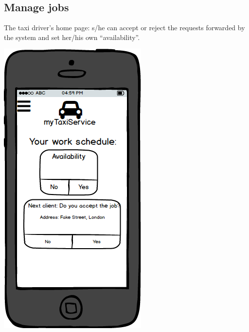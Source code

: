 \documentclass[a4paper,11pt]{report} %
\begin{document}
	\subsection{Manage jobs} The taxi driver's home page: s/he can accept or reject the requests forwarded by the system and set her/his own ``availability''.
	\begin{center}
		\includegraphics[width=0.4\linewidth]{Pictures/DriverPage}
	\end{center}
	\pagebreak
	
\end{document}
